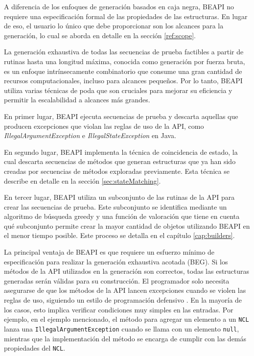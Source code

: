 A diferencia de los enfoques de generación basados en caja negra, \textsf{BEAPI} no requiere una especificación formal de las propiedades de las estructuras. En lugar de eso, el usuario lo único que debe proporcionar son los alcances para la generación, lo cual se aborda en detalle en la sección \ref{ref:scope}.

La generación exhaustiva de todas las secuencias de prueba factibles a partir de rutinas hasta una longitud máxima, conocida como generación por fuerza bruta, es un enfoque intrínsecamente combinatorio que consume una gran cantidad de recursos computacionales, incluso para alcances pequeños. Por lo tanto, \textsf{BEAPI} utiliza varias técnicas de poda que son cruciales para mejorar su eficiencia y permitir la escalabilidad a alcances más grandes.

En primer lugar, \textsf{BEAPI} ejecuta secuencias de prueba y descarta aquellas que producen excepciones que violan las reglas de uso de la API, como \emph{IllegalArgumentException} e \emph{IllegalStateException} en Java.

En segundo lugar, \textsf{BEAPI} implementa la técnica de coincidencia de estado, la cual descarta secuencias de métodos que generan estructuras que ya han sido creadas por secuencias de métodos exploradas previamente. Esta técnica se describe en detalle en la sección \ref{sec:stateMatching}.

En tercer lugar, \textsf{BEAPI} utiliza un subconjunto de las rutinas de la API para crear las secuencias de prueba. Este subconjunto se identifica mediante un algoritmo de búsqueda greedy y una función de valoración que tiene en cuenta qué subconjunto permite crear la mayor cantidad de objetos utilizando \textsf{BEAPI} en el menor tiempo posible. Este proceso se detalla en el capítulo \ref{cap:builders}.

La principal ventaja de \textsf{BEAPI} es que requiere un esfuerzo mínimo de especificación para realizar la generación exhaustiva acotada (BEG). Si los métodos de la API utilizados en la generación son correctos, todas las estructuras generadas serán válidas para su construcción. El programador solo necesita asegurarse de que los métodos de la API lancen excepciones cuando se violen las reglas de uso, siguiendo un estilo de programación defensivo \cite{Liskov00}. En la mayoría de los casos, esto implica verificar condiciones muy simples en las entradas. Por ejemplo, en el ejemplo mencionado, el método para agregar un elemento a un \texttt{NCL} lanza una \texttt{IllegalArgumentException} cuando se llama con un elemento \texttt{null}, mientras que la implementación del método se encarga de cumplir con las demás propiedades del \texttt{NCL}.

